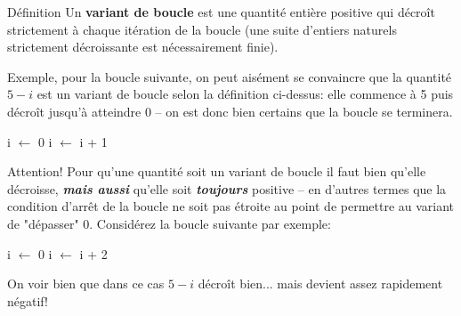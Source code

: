 \documentclass[12pt]{article}
\begin{document}
	\begin{MonAmp}{Définition}
		Un \textbf{variant de boucle} est une quantité entière positive qui décroît strictement à chaque itération de la boucle (une suite d’entiers naturels strictement décroissante est nécessairement finie).
		\vspace{\baselineskip}
		
		Exemple, pour la boucle suivante, on peut aisément se convaincre que la quantité $5 - i$ est un variant de boucle selon la définition ci-dessus: elle commence à 5 puis décroît jusqu'à atteindre 0 -- on est donc bien certains que la boucle se terminera.
		
		\begin{algorithmic}[1]
			\State i $\leftarrow$ 0
			\State i $\leftarrow$ i + 1
			\EndWhile
		\end{algorithmic}
	\end{MonAmp}
	
		Attention! Pour qu'une quantité soit un variant de boucle il faut bien qu'elle décroisse, \textbf{\textit{mais aussi}} qu'elle soit \textbf{\textit{toujours}} positive -- en d'autres termes que la condition d'arrêt de la boucle ne soit pas étroite au point de permettre au variant de "dépasser" 0. Considérez la boucle suivante par exemple:
	\begin{algorithmic}[1]
		\State i $\leftarrow$ 0
		\State{}
		\State i $\leftarrow$ i + 2
		\EndWhile
	\end{algorithmic}
	
	On voir bien que dans ce cas $5-i$ décroît bien... mais devient assez rapidement négatif!
	
\end{document}
